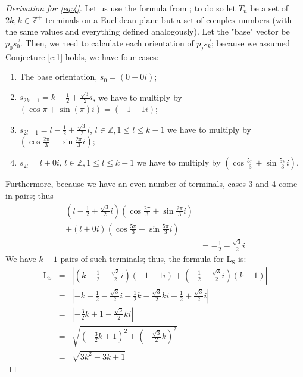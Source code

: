 \documentclass{mpaper}
\begin{document}
\begin{proof}[Derivation for \eqref{eq:4}]
  Let us use the formula from \cite{uteshev2021length}; to do so let $T_n$ be a set of $2k, k\in\mathbb{Z^+}$ terminals on a Euclidean plane but a set of complex numbers (with the same values and everything defined analogously). Let the "base" vector be $\overrightarrow{p_0s_0}$. Then, we need to calculate each orientation of $\overrightarrow{p_js_k}$; because we assumed Conjecture \ref{c:1} holds, we have four cases:
  \begin{enumerate}
    \item The base orientation, $s_0=(0+0i)$;
    \item $s_{2k-1}=k-\frac{1}{2}+\frac{\sqrt{3}}{2}i$, we have to multiply by $(\cos{\pi}+\sin({\pi})i)\allowbreak=(-1-1i)$;
    \item $s_{2l-1}=l-\frac{1}{2}+\frac{\sqrt{3}}{2}i$, $l\in\mathbb{Z}, 1\leq l\leq k-1$ we have to multiply by $(\cos{\frac{2\pi}{3}}+\sin{\frac{2\pi}{3}}i)$;
    \item $s_{2l}=l+0i$, $l\in\mathbb{Z}, 1\leq l\leq k-1$ we have to multiply by $(\cos{\frac{5\pi}{3}}+\sin{\frac{5\pi}{3}}i)$.
  \end{enumerate}
  Furthermore, because we have an even number of terminals, cases 3 and 4 come in pairs; thus 
  \begin{align*}
    (l-\frac{1}{2}+\frac{\sqrt{3}}{2}i)(\cos{\frac{2\pi}{3}}+\sin{\frac{2\pi}{3}}i)\\
    +(l+0i)(\cos{\frac{5\pi}{3}}+\sin{\frac{5\pi}{3}}i)\\
    &=-\frac{1}{2}-\frac{\sqrt{3}}{2}i
  \end{align*}
  We have $k-1$ pairs of such terminals; thus, the formula for $\operatorname{L_S}$ is:
  \begin{align*}
    \operatorname{L_S} &=& \left| (k-\frac{1}{2}+\frac{\sqrt{3}}{2}i)(-1-1i)+ (-\frac{1}{2}-\frac{\sqrt{3}}{2}i)(k-1)\right| \\ 
    &=& \left| -k+\frac{1}{2}-\frac{\sqrt{3}}{2}i-\frac{1}{2}k-\frac{\sqrt{3}}{2}ki+\frac{1}{2}+\frac{\sqrt{3}}{2}i\right| \\
    &=& \left|-\frac{3}{2}k+1-\frac{\sqrt{3}}{2}ki\right| \\
    &=& \sqrt{(-\frac{3}{2} k +1)^2 + (-\frac{\sqrt{3}}{2} k)^2} \\
    &=& \sqrt{3k^2 -3k + 1}
  \end{align*}
\end{proof}
\end{document}
